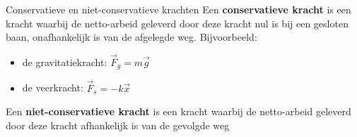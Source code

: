\begin{theo}{Conservatieve en niet-conservatieve krachten}
    Een \textbf{conservatieve kracht} is een kracht waarbij de netto-arbeid geleverd door deze kracht nul is bij een gesloten baan, onafhankelijk is van de afgelegde weg. Bijvoorbeeld: 
    \begin{itemize}
        \item de gravitatiekracht: $ \Vec{F}_g = m\Vec{g} $      
            
        
            
        \item de veerkracht: $ \Vec{F}_s = -k\Vec{x} $
    \end{itemize}
    
    \noindent Een \textbf{niet-conservatieve kracht} is een kracht waarbij de netto-arbeid geleverd door deze kracht afhankelijk is van de gevolgde weg 
\end{theo}

